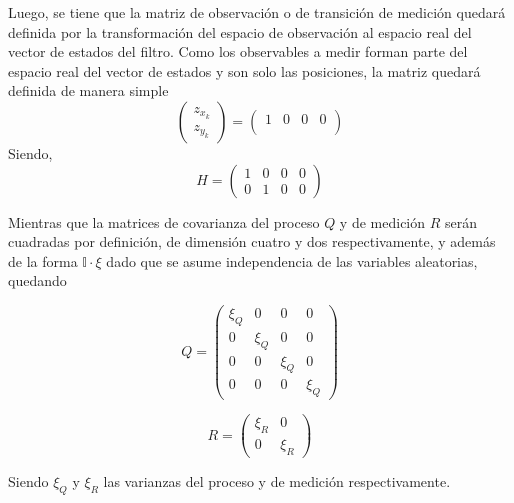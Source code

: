 Luego, se tiene que la matriz de observación o de transición de medición quedará definida por la transformación del espacio de observación al espacio real del vector de estados del filtro. Como los observables a medir forman parte del espacio real del vector de estados y son solo las posiciones, la matriz quedará definida de manera simple
\begin{equation}
\begin{pmatrix} z_{x_{k}} \\ z_{y_{k}} \end{pmatrix}=\begin{pmatrix}
1 & 0 & 0  & 0\\
\end{pmatrix}
\end{equation}
Siendo,
\begin{equation}
H = 
\begin{pmatrix}
1 & 0 & 0  & 0\\
0 & 1  & 0 & 0 
\end{pmatrix}
\end{equation}

Mientras que la matrices de covarianza del proceso $Q$ y de medición $R$ serán cuadradas por definición, de dimensión cuatro y dos respectivamente, y además de la forma $\mathbb{I}\cdot \xi$ dado que se asume independencia de las variables aleatorias, quedando

\begin{equation}
Q = 
\begin{pmatrix}
\xi_Q & 0 & 0  & 0\\
0 & \xi_Q  & 0 & 0\\
0 & 0  & \xi_Q  & 0\\
0 & 0  & 0  & \xi_Q 
\end{pmatrix}
\end{equation}

\begin{equation}
R = 
\begin{pmatrix}
\xi_R & 0 \\
0 & \xi_R 
\end{pmatrix}
\end{equation}

Siendo $\xi_Q$ y $\xi_R$ las varianzas del proceso y de medición respectivamente.

